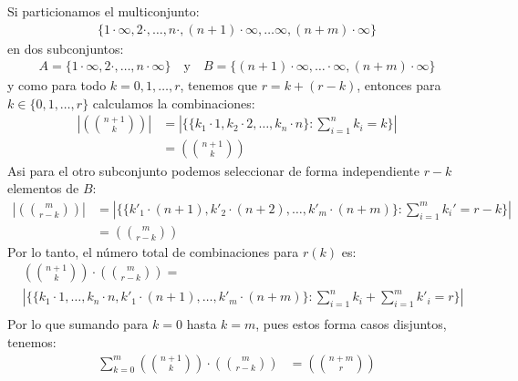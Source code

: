 \begin{solucion}
    Si particionamos el multiconjunto:
    \begin{align*}
        \{1\cdot\infty,2\cdot,\ldots,n\cdot,(n+1)\cdot\infty,\ldots\infty,(n+m)\cdot \infty\}
    \end{align*}
    en dos subconjuntos:
    \begin{align*}
        A=\{1\cdot\infty,2\cdot,\ldots,n\cdot \infty\} \quad \text{y} \quad B=\{(n+1)\cdot\infty,\ldots\cdot\infty,(n+m)\cdot \infty\}
    \end{align*}
    y como para todo $k = 0,1,\ldots,r$, tenemos que $r=k+(r-k)$, entonces para $k \in \{0,1,\ldots,r\}$ calculamos la combinaciones:
    \begin{align*}
       \left| \left(\binom{n+1}{k}\right) \right| &= \left| \{\{k_1 \cdot 1, k_2 \cdot 2, \ldots, k_n \cdot n\}: \sum_{i=1}^n k_i=k\} \right| \\
       &= \left(\binom{n+1}{k}\right)
    \end{align*}
    Asi para el otro subconjunto podemos seleccionar de forma independiente $r-k$ elementos de $B$:
    \begin{align*}
        \left| \left(\binom{m}{r-k}\right) \right| &= \left| \{\{k'_1 \cdot (n+1), k'_2 \cdot (n+2), \ldots, k'_m \cdot (n+m)\}: \sum_{i=1}^m k_i'=r-k\} \right| \\
        &= \left(\binom{m}{r-k}\right)
    \end{align*}
    Por lo tanto, el número total de combinaciones para $r(k)$ es:
    \begin{align*}
       &\left(\binom{n+1}{k}\right) \cdot \left(\binom{m}{r-k}\right) = \\
       &\left| \{\{k_1 \cdot 1, \ldots, k_n \cdot n, k'_1 \cdot (n+1), \ldots, k'_m \cdot (n+m)\}: \sum_{i=1}^n k_i + \sum_{i=1}^m k'_i = r\} \right| \\
    \end{align*}
    Por lo que sumando para $k=0$ hasta $k=m$, pues estos forma casos disjuntos, tenemos:
    \begin{align*}
        \sum_{k=0}^m\left(\binom{n+1}{k}\right) \cdot \left(\binom{m}{r-k}\right) &= \left(\binom{n+m}{r}\right) \\
    \end{align*}
\end{solucion}